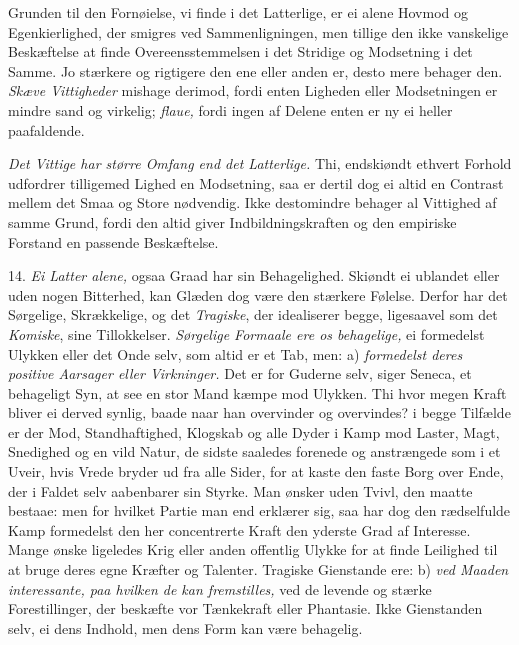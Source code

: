 \documentclass[12pt,a4paper]{article}
\newcommand{\opage}[1]{\marginnote{\footnotesize\textit{[#1]}}}
\begin{document}
Grunden til den Fornøielse, vi finde i det Latterlige, er ei alene Hovmod og
Egenkierlighed, der smigres ved Sammenligningen, men tillige den ikke vanskelige
\opage{259} Beskæftelse at finde Overeensstemmelsen i det Stridige og Modsetning i det Samme. Jo
stærkere og rigtigere den ene eller anden er, desto mere behager den. \emph{Skæve
Vittigheder} mishage derimod, fordi enten Ligheden eller Modsetningen er mindre sand og
virkelig; \emph{flaue,} fordi ingen af Delene enten er ny ei heller paafaldende.

\emph{Det Vittige har større Omfang end det Latterlige.} Thi, endskiøndt ethvert Forhold
udfordrer tilligemed Lighed en Modsetning, saa er dertil dog ei altid en Contrast mellem
det Smaa og Store nødvendig. Ikke destomindre behager al Vittighed af samme Grund, fordi
den altid giver Indbildningskraften og den empiriske Forstand en passende Beskæftelse.

14. \emph{Ei Latter alene,} ogsaa Graad har sin Behagelighed. Skiøndt ei ublandet eller
uden nogen Bitterhed, kan Glæden dog være den stærkere Følelse. Derfor har det Sørgelige,
Skrækkelige, og det \emph{Tragiske}, der idealiserer begge, ligesaavel som det
\emph{Komiske}, sine Tillokkelser. \emph{Sørgelige Formaale ere os behagelige,} ei
formedelst Ulykken eller det Onde selv, som altid er et Tab, men: a) \emph{formedelst deres
positive Aarsager eller Virkninger.} Det er for Guderne selv, siger Seneca, et behageligt
Syn, at see en stor Mand kæmpe mod Ulykken. Thi hvor megen Kraft bliver ei derved synlig,
baade naar han overvinder og overvindes? i begge Tilfælde er der Mod,
\opage{260} Standhaftighed, Klogskab og alle Dyder i Kamp mod Laster, Magt, Snedighed og en vild Natur,
de sidste saaledes forenede og anstrængede som i et Uveir, hvis Vrede bryder ud fra alle
Sider, for at kaste den faste Borg over Ende, der i Faldet selv aabenbarer sin Styrke. Man
ønsker uden Tvivl, den maatte bestaae: men for hvilket Partie man end erklærer sig, saa har
dog den rædselfulde Kamp formedelst den her concentrerte Kraft den yderste Grad af
Interesse. Mange ønske ligeledes Krig eller anden offentlig Ulykke for at finde Leilighed
til at bruge deres egne Kræfter og Talenter. Tragiske Gienstande ere: b) \emph{ved Maaden
interessante, paa hvilken de kan fremstilles,} ved de levende og stærke Forestillinger, der
beskæfte vor Tænkekraft eller Phantasie. Ikke Gienstanden selv, ei dens Indhold, men dens
Form kan være behagelig.
\end{document}
